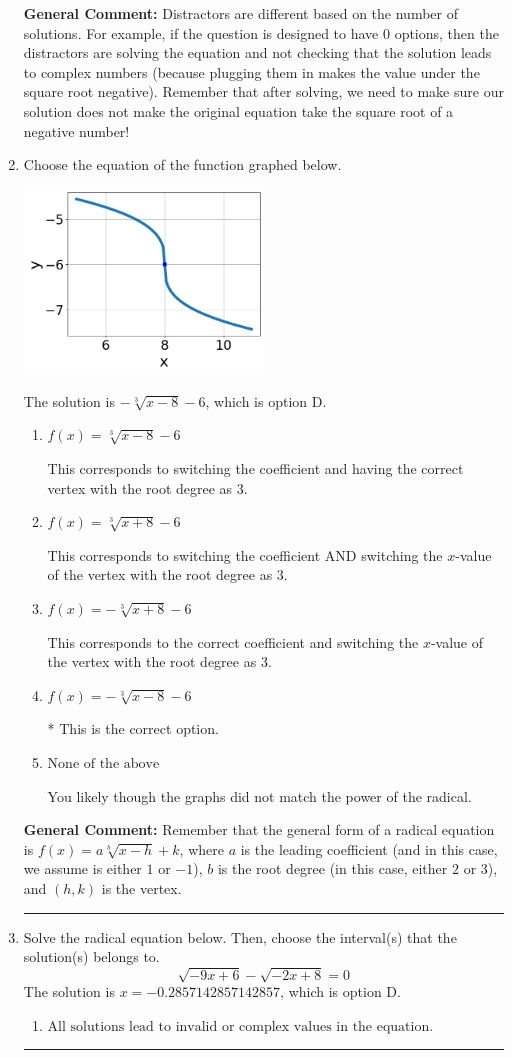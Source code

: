 \documentclass{extbook}[14pt]
\newcommand{\litem}[1]{\item #1

\rule{\textwidth}{0.4pt}}
\begin{document}
\begin{enumerate}
{\textbf{General Comment:} Distractors are different based on the number of solutions. For example, if the question is designed to have 0 options, then the distractors are solving the equation and not checking that the solution leads to complex numbers (because plugging them in makes the value under the square root negative). Remember that after solving, we need to make sure our solution does not make the original equation take the square root of a negative number!
}
\litem{
Choose the equation of the function graphed below.

\begin{center}
    \includegraphics[width=0.5\textwidth]{../Figures/radicalGraphToEquationCopyB.png}
\end{center}


The solution is \( - \sqrt[3]{x - 8} - 6 \), which is option D.\begin{enumerate}[label=\Alph*.]
\item \( f(x) = \sqrt[3]{x - 8} - 6 \)

This corresponds to switching the coefficient and having the correct vertex with the root degree as $3$.
\item \( f(x) = \sqrt[3]{x + 8} - 6 \)

This corresponds to switching the coefficient AND switching the $x$-value of the vertex with the root degree as $3$.
\item \( f(x) = - \sqrt[3]{x + 8} - 6 \)

This corresponds to the correct coefficient and switching the $x$-value of the vertex with the root degree as $3$.
\item \( f(x) = - \sqrt[3]{x - 8} - 6 \)

* This is the correct option.
\item \( \text{None of the above} \)

You likely though the graphs did not match the power of the radical.
\end{enumerate}

\textbf{General Comment:} Remember that the general form of a radical equation is $ f(x) = a \sqrt[b]{x - h} + k$, where $a$ is the leading coefficient (and in this case, we assume is either $1$ or $-1$), $b$ is the root degree (in this case, either $2$ or $3$), and $(h, k)$ is the vertex.
}
\litem{
Solve the radical equation below. Then, choose the interval(s) that the solution(s) belongs to.
\[ \sqrt{-9 x + 6} - \sqrt{-2 x + 8} = 0 \]The solution is \( x = -0.2857142857142857 \), which is option D.\begin{enumerate}[label=\Alph*.]
\item \( \text{All solutions lead to invalid or complex values in the equation.} \)


\end{enumerate}}
\end{enumerate}
\end{document}
